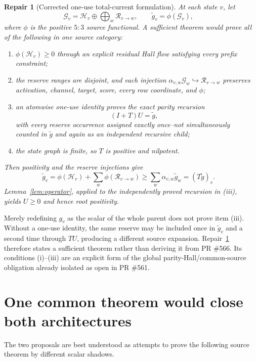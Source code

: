 \documentclass[11pt]{article}
\newtheorem{repair}[theorem]{Repair}
\newcommand{\1}{\mathbf 1}
\begin{document}
\begin{repair}[Corrected one-use total-current formulation]\label{repair:total}
At each state $v$, let
\[
\mathcal G_v=\mathcal H_v\oplus\bigoplus_w\mathcal R_{v\to w},
\qquad
\widetilde g_v=\phi(\mathcal G_v),
\]
where $\phi$ is the positive $5{:}3$ source functional.  A sufficient theorem would prove all of the following in one source category:
\begin{enumerate}[label=(\roman*)]
\item $\phi(\mathcal H_v)\ge0$ through an explicit residual Hall flow satisfying every prefix constraint;
\item the reserve ranges are disjoint, and each injection $\alpha_{v,w}\mathcal G_w\hookrightarrow\mathcal R_{v\to w}$ preserves activation, channel, target, score, every row coordinate, and $\phi$;
\item an atomwise one-use identity proves the exact parity recursion
\[
(I+T)U=\widetilde g,
\]
with every reserve occurrence assigned exactly once--not simultaneously counted in $\widetilde g$ and again as an independent recursive child;
\item the state graph is finite, so $T$ is positive and nilpotent.
\end{enumerate}
Then positivity and the reserve injections give
\[
\widetilde g_v
=\phi(\mathcal H_v)+\sum_w\phi(\mathcal R_{v\to w})
\ge\sum_w\alpha_{v,w}\widetilde g_w=(T\widetilde g)_v.
\]
Lemma~\ref{lem:operator}, applied to the independently proved recursion in (iii), yields $U\ge0$ and hence root positivity.
\end{repair}

Merely redefining $g_v$ as the scalar of the whole parent does not prove item (iii).  Without a one-use identity, the same reserve may be included once in $\widetilde g_v$ and a second time through $TU$, producing a different source expansion.  Repair~\ref{repair:total} therefore states a sufficient theorem rather than deriving it from PR \#566.  Its conditions (i)--(iii) are an explicit form of the global parity-Hall/common-source obligation already isolated as open in PR \#561.

\section{One common theorem would close both architectures}

The two proposals are best understood as attempts to prove the following source theorem by different scalar shadows.
\end{document}

